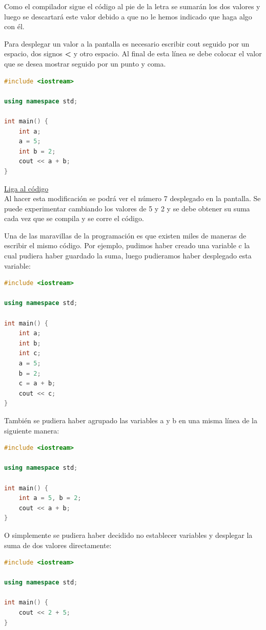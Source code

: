 \documentclass{article}
\begin{document}
Como el compilador sigue el código al pie de la letra se sumarán los dos valores y luego se descartará este valor debido a que no le hemos indicado que haga algo con él.

Para desplegar un valor a la pantalla es necesario escribir cout seguido por un espacio, dos signos \textbf{<} y otro espacio. Al final de esta línea se debe colocar el valor que se desea mostrar seguido por un punto y coma.

\begin{lstlisting}[language=C++, title=Tu primer programa]
#include <iostream>

using namespace std;

int main() {
	int a;
	a = 5;
	int b = 2;
	cout << a + b;
}
\end{lstlisting}
\href{https://repl.it/@Jamesscn/Mi-primer-programa}{Liga al código}\\

Al hacer esta modificación se podrá ver el número 7 desplegado en la pantalla. Se puede experimentar cambiando los valores de 5 y 2 y se debe obtener su suma cada vez que se compila y se corre el código.

Una de las maravillas de la programación es que existen miles de maneras de escribir el mismo código. Por ejemplo, pudimos haber creado una variable c la cual pudiera haber guardado la suma, luego pudieramos haber desplegado esta variable:

\begin{lstlisting}[language=C++, title=¿El mismo programa?]
#include <iostream>

using namespace std;

int main() {
	int a;
	int b;
	int c;
	a = 5;
	b = 2;
	c = a + b;
	cout << c;
}
\end{lstlisting}

También se pudiera haber agrupado las variables a y b en una misma línea de la siguiente manera:

\begin{lstlisting}[language=C++, title=¿El mismo programa?]
#include <iostream>

using namespace std;

int main() {
	int a = 5, b = 2;
	cout << a + b;
}
\end{lstlisting}

O simplemente se pudiera haber decidido no establecer variables y desplegar la suma de dos valores directamente:

\begin{lstlisting}[language=C++, title=¿El mismo programa?]
#include <iostream>

using namespace std;

int main() {
	cout << 2 + 5;
}
\end{lstlisting}
\end{document}
